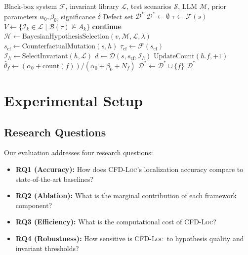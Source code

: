 \documentclass[journal]{IEEEtran}
\theoremstyle{plain}
\theoremstyle{definition}
\theoremstyle{remark}
\newcommand{\methodname}{\textsc{CFD-Loc}}
\newcommand{\invlib}{\mathcal{L}}
\newcommand{\sys}{\mathcal{F}}
\newcommand{\beh}{\mathcal{B}}
\newcommand{\diag}{\mathcal{D}}
\newcommand{\feat}{\mathcal{F}}
\newcommand{\Prob}{\mathbb{P}}
\begin{document}
\begin{algorithm}[t]
\caption{\methodname\ Full Pipeline with Bayesian Diagnosis}
\label{alg:full}
\begin{algorithmic}[1]
\Require Black-box system $\sys$, invariant library $\invlib$, test scenarios $\mathcal{S}$, LLM $\mathcal{M}$, prior parameters $\alpha_0,\beta_0$, significance $\delta$
\Ensure Defect set $\mathcal{D}^*$
\State $\mathcal{D}^* \gets \emptyset$
    \State $\tau \gets \sys(s)$
    \State $V \gets \{\mathcal{I}_k \in \invlib \mid \beh(\tau) \not\models A_k\}$
        \State \textbf{continue}
    \EndIf
    \State $\mathcal{H} \gets \text{BayesianHypothesisSelection}(v, \mathcal{M}, \invlib, \lambda)$ 
        \State $s_{\text{cf}} \gets \text{CounterfactualMutation}(s, h)$ 
        \State $\tau_{\text{cf}} \gets \sys(s_{\text{cf}})$
        \State $\mathcal{I}_h \gets \text{SelectInvariant}(h, \invlib)$
        \State $d \gets \diag(s, s_{\text{cf}}, \mathcal{I}_h)$
            \State $\text{UpdateCount}(h.f, +1)$
        \EndIf
    \EndFor
\EndFor
\For{each $f \in \feat$}
    \State $\hat{\theta}_f \gets (\alpha_0 + \text{count}(f)) / (\alpha_0 + \beta_0 + N_f)$
    \If{$\Prob(\theta_f > 0.5) > 1 - \delta$}
        \State $\mathcal{D}^* \gets \mathcal{D}^* \cup \{f\}$
    \EndIf
\EndFor
\State \Return $\mathcal{D}^*$
\end{algorithmic}
\end{algorithm}

\section{Experimental Setup}
\label{sec:experimental}

\subsection{Research Questions}

Our evaluation addresses four research questions:
\begin{itemize}[nosep]
    \item \textbf{RQ1 (Accuracy):} How does \methodname's localization accuracy compare to state-of-the-art baselines?
    \item \textbf{RQ2 (Ablation):} What is the marginal contribution of each framework component?
    \item \textbf{RQ3 (Efficiency):} What is the computational cost of \methodname?
    \item \textbf{RQ4 (Robustness):} How sensitive is \methodname\ to hypothesis quality and invariant thresholds?
\end{itemize}
\end{document}
